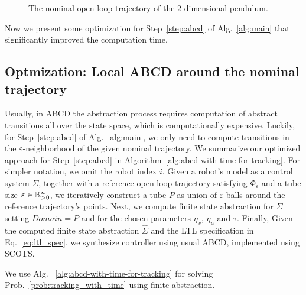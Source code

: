 \begin{remark}
\begin{figure}
			\caption{The nominal open-loop trajectory of the $2$-dimensional pendulum.}
			\label{fig:traj 2d pendulum}
		\end{figure}
\end{remark}

Now we present some optimization for Step~\ref{step:abcd} of Alg.~\ref{alg:main} that significantly improved the computation time.

\subsection{Optmization: Local ABCD around the nominal trajectory}\label{sec:local_abcd}
Usually, in ABCD the abstraction process requires computation of abstract transitions all over the state space, which is computationally expensive.
Luckily, for Step~\ref{step:abcd} of Alg.~\ref{alg:main}, we only need to compute transitions in the $\varepsilon$-neighborhood of the given nominal trajectory.
We summarize our optimized approach for Step~\ref{step:abcd} in Algorithm~\ref{alg:abcd-with-time-for-tracking}.
For simpler notation, we omit the robot index $i$.
Given a robot's model as a control system $\Sigma$, together with a reference open-loop trajectory satisfying $\Phi_\varepsilon$ and a tube size $\varepsilon\in \mathbb{R}_{>0}^n$, we iteratively construct a tube $P$ as union of $\varepsilon$-balls around the reference trajectory's points. 
Next, we compute finite state abstraction for $\Sigma$ setting $Domain=P$ and for the chosen parameters $\eta_x$, $\eta_u$ and $\tau$. 
Finally, Given the computed finite state abstraction $\widehat \Sigma$ and the LTL specification in Eq.~\eqref{eq:ltl_spec}, we synthesize controller using usual ABCD, implemented using SCOTS. %

We use Alg.~ \ref{alg:abcd-with-time-for-tracking} for solving Prob.~\ref{prob:tracking_with_time} using finite abstraction.




